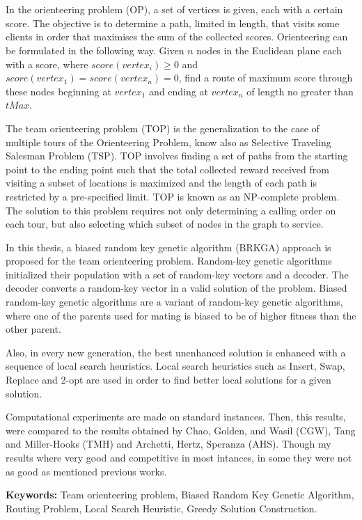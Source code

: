 
\chapter*{\tituloAbstractEn}

\noindent In the orienteering problem (OP), a set of vertices is given, each with a certain score. The objective is to determine a path, limited in length, that visits some clients in order that maximises the sum of the collected scores. Orienteering can be formulated in the following way. Given $n$ nodes in the Euclidean plane each with a score, where $score(vertex_i) \geq 0$ and $score(vertex_1) = score(vertex_n) = 0$, find a route of maximum score through these nodes beginning at $vertex_1$ and ending at $vertex_n$ of length no greater than $tMax$.

\bigskip

The team orienteering problem (TOP) is the generalization to the case of multiple tours of the Orienteering Problem, know also as Selective Traveling Salesman Problem (TSP). TOP involves finding a set of paths from the starting point to the ending point such that the total collected reward received from visiting a subset of locations is maximized and the length of each path is restricted by a pre-specified limit. TOP is known as an NP-complete problem. The solution to this problem requires not only determining a calling order on each tour, but also selecting which subset of nodes in the graph to service.

\bigskip

In this thesis, a biased random key genetic algorithm (BRKGA) approach is proposed for the team orienteering problem. Random-key genetic algorithms initialized their population with a set of random-key vectors and a decoder. The decoder converts a random-key vector in a valid solution of the problem. Biased random-key genetic algorithms are a variant of random-key genetic algorithms, where one of the parents used for mating is biased to be of higher fitness than the other parent.

\bigskip

Also, in every new generation, the best unenhanced solution is enhanced with a sequence of local search heuristics. Local search heuristics such as Insert, Swap, Replace and 2-opt are used in order to find better local solutions for a given solution. 

\bigskip

Computational experiments are made on standard instances. Then, this results, were compared to the results obtained by Chao, Golden, and Wasil (CGW), Tang and Miller-Hooks (TMH) and Archetti, Hertz, Speranza (AHS). Though my results where very good and competitive in most intances, in some they were not as good as mentioned previous works.

\bigskip

\noindent\textbf{Keywords:} Team orienteering problem, Biased Random Key Genetic Algorithm, Routing Problem, Local Search Heuristic, Greedy Solution Construction.